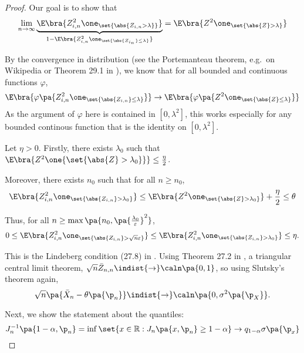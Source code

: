 \begin{proof}
  Our goal is to show that \begin{equation}
  \lim_{n\rightarrow\infty} \underbrace{\E\bra{Z_{i,n}^2 \one_{\set{\abs{Z_{i,n}> \lambda}}}}}_{1-\E\bra{Z_{i,n}^2 \one_{\set{\abs{Z_{i_n}}\leq\lambda}}}} = \E\bra{Z^2\one_{\set{\abs{Z}>\lambda}}}
  \end{equation}

  By the convergence in distribution (see the Portemanteau theorem, e.g.~on Wikipedia or Theorem 29.1 in \cite{bill}), we know that for all bounded and continuous functions $\varphi$,
  \begin{equation}
    \E\bra{\varphi\pa{Z_{i,n}^2 \one_{\set{\abs{Z_{i,n}}\leq \lambda }}}}\rightarrow \E\bra{\varphi\pa{Z^2 \one_{\set{\abs{Z}\leq \lambda}}}}
  \end{equation}
  As the argument of $\varphi$ here is contained in $[0,\lambda^2]$, this works especially for any bounded continous function that is the identity on $[0,\lambda^2]$.

  Let $\eta>0$. Firstly, there exists $\lambda_0$ such that $\E\bra{Z^2 \one{\set{\abs{Z}>\lambda_0}}}\leq\frac{\eta}{2}$.

  Moreover, there exists $ n_0 $ such that for all $ n\geq n_0$,
  \begin{equation}
  \E\bra{Z^2_{i,n} \one_{\set{\abs{Z_{i,n}}>\lambda_0}}}
  \leq \E\bra{Z^2 \one_{\set{\abs{Z}>\lambda_0}}} + \frac{\eta}{2}
  \leq \theta
  \end{equation}

  Thus, for all $n\geq \max\pa{n_0, \pa{\frac{\lambda_0}{\varepsilon}}^2}$,
  \begin{equation}\label{eq:lindeberg}
    0 \leq \E\bra{Z^2_{i,n} \one_{\set{\abs{Z_{i,n}}>\sqrt{n}\varepsilon}}} \leq \E\bra{Z^2_{i,n} \one_{\set{\abs{Z_{i,n}}>\lambda_0}}} \leq \eta.
  \end{equation}

  This is the Lindeberg condition (27.8) in \cite{bill}. Using Theorem 27.2 in \cite{bill}, a triangular central limit theorem, $\sqrt{n}\bar{Z}_{n,n}\indist{\rightarrow }\caln\pa{0,1}$, so using Slutsky's theorem again,
  \begin{equation}
    \sqrt{n} \pa{\bar{X}_n - \theta\pa{\p_n}}\indist{\rightarrow} \caln\pa{0,\sigma^2\pa{\p_X}}.
  \end{equation}

  Next, we show the statement about the quantiles:
  \begin{equation}
  J_n^{-1}\pa{1-\alpha, \p_n} = \inf\set{x\in\mathbb{R}:J_n\pa{x,\p_n} \geq 1-\alpha}\rightarrow q_{1-\alpha}\sigma\pa{\p_x}
  \end{equation}


\end{proof}
